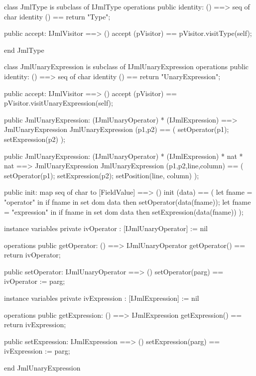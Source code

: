 \begin{vdm_al}
class JmlType is subclass of IJmlType
operations
  public identity: () ==> seq of char
  identity () == return "Type";

  public accept: IJmlVisitor ==> ()
  accept (pVisitor) == pVisitor.visitType(self);

end JmlType
\end{vdm_al}
\begin{vdm_al}
class JmlUnaryExpression is subclass of IJmlUnaryExpression
operations
  public identity: () ==> seq of char
  identity () == return "UnaryExpression";

  public accept: IJmlVisitor ==> ()
  accept (pVisitor) == pVisitor.visitUnaryExpression(self);

  public JmlUnaryExpression:
    (IJmlUnaryOperator) *
    (IJmlExpression) ==> JmlUnaryExpression
  JmlUnaryExpression (p1,p2) == 
    ( setOperator(p1);
      setExpression(p2) );

  public JmlUnaryExpression:
    (IJmlUnaryOperator) *
    (IJmlExpression) *
    nat *
    nat ==> JmlUnaryExpression
  JmlUnaryExpression (p1,p2,line,column) == 
    ( setOperator(p1);
      setExpression(p2);
      setPosition(line, column) );

  public init: map seq of char to [FieldValue] ==> ()
  init (data) ==
    ( let fname = "operator" in
        if fname in set dom data
        then setOperator(data(fname));
      let fname = "expression" in
        if fname in set dom data
        then setExpression(data(fname)) );

instance variables
  private ivOperator : [IJmlUnaryOperator] := nil

operations
  public getOperator: () ==> IJmlUnaryOperator
  getOperator() == return ivOperator;

  public setOperator: IJmlUnaryOperator ==> ()
  setOperator(parg) == ivOperator := parg;

instance variables
  private ivExpression : [IJmlExpression] := nil

operations
  public getExpression: () ==> IJmlExpression
  getExpression() == return ivExpression;

  public setExpression: IJmlExpression ==> ()
  setExpression(parg) == ivExpression := parg;

end JmlUnaryExpression
\end{vdm_al}

